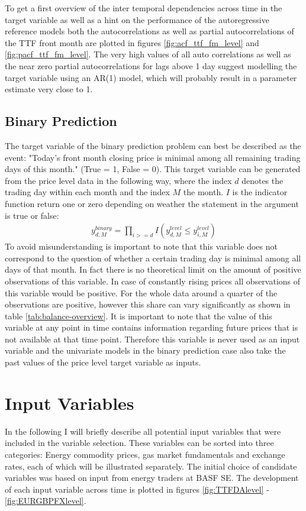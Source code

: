 To get a first overview of the inter temporal dependencies across time in the target variable as well as a hint on the performance of the autoregressive reference models both the autocorrelations  as well as partial autocorrelations of the TTF front month are plotted in figures \ref{fig:acf_ttf_fm_level} and \ref{fig:pacf_ttf_fm_level}. The very high values of all auto correlations as well as the near zero partial autocorrelations for lags above 1 day suggest modelling the target variable using an AR(1) model, which will probably result in a parameter estimate very close to 1. 

\subsection{Binary Prediction}
The target variable of the binary prediction problem can best be described as the event: "Today's front month closing price is minimal among all remaining trading days of this month." (True = 1, False = 0). This target variable can be generated from the price level data in the following way, where the index $d$ denotes the trading day within each month and the index $M$ the month. $I$ is the indicator function return one or zero depending on weather the statement in the argument is true or false:
\begin{align*}
y_{d,M}^{binary} = \prod_{i >= d} I(y_{d,M}^{level} \leq y_{i,M}^{level})
\end{align*}
To avoid misunderstanding is important to note that this variable does not correspond to the question of whether a certain trading day is minimal among all days of that month. In fact there is no theoretical limit on the amount of positive observations of this variable. In case of constantly rising prices all observations of this variable would be positive. For the whole data around a quarter of the observations are positive, however this share can vary significantly as shown in table \ref{tab:balance-overview}. It is important to note that the value of this variable at any point in time contains information regarding future prices that is not available at that time point. Therefore this variable is never used as an input variable and the univariate models in the binary prediction case also take the past values of the price level target variable as inputs.

\section{Input Variables}\label{Sec:Input}
In the following I will briefly describe all potential input variables that were included in the variable selection. These variables can be sorted into three categories: Energy commodity prices, gas market fundamentals and exchange rates, each of which will be illustrated separately. The initial choice of candidate variables was based on input from energy traders at BASF SE. The development of each input variable across time is plotted in figures  \ref{fig:TTFDAlevel} - \ref{fig:EURGBPFXlevel}.
